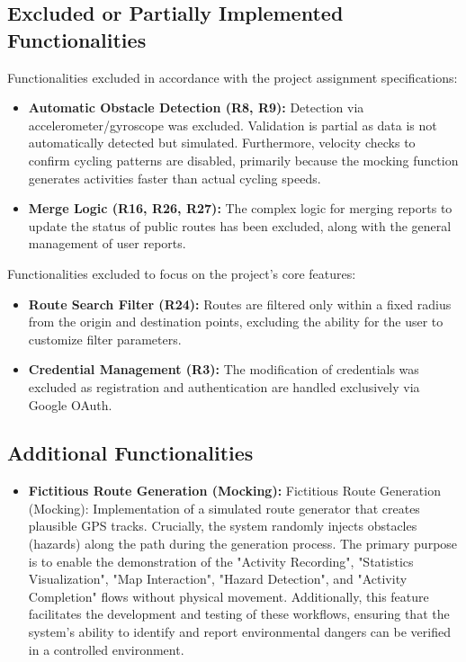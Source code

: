 \subsection{Excluded or Partially Implemented Functionalities}
Functionalities excluded in accordance with the project assignment specifications:
\begin{itemize}
    \item \textbf{Automatic Obstacle Detection (R8, R9):} Detection via accelerometer/gyroscope was excluded. Validation is partial as data is not automatically detected but simulated. Furthermore, velocity checks to confirm cycling patterns are disabled, primarily because the mocking function generates activities faster than actual cycling speeds.
    \item \textbf{Merge Logic (R16, R26, R27):} The complex logic for merging reports to update the status of public routes has been excluded, along with the general management of user reports.
\end{itemize}

Functionalities excluded to focus on the project's core features:
\begin{itemize}
    \item \textbf{Route Search Filter (R24):} Routes are filtered only within a fixed radius from the origin and destination points, excluding the ability for the user to customize filter parameters.
    \item \textbf{Credential Management (R3):} The modification of credentials was excluded as registration and authentication are handled exclusively via Google OAuth.
\end{itemize}

\subsection{Additional Functionalities}
\begin{itemize}
    \item \textbf{Fictitious Route Generation (Mocking):} Fictitious Route Generation (Mocking): Implementation of a simulated route generator that creates plausible GPS tracks. Crucially, the system randomly injects obstacles (hazards) along the path during the generation process. The primary purpose is to enable the demonstration of the "Activity Recording", "Statistics Visualization", "Map Interaction", "Hazard Detection", and "Activity Completion" flows without physical movement. Additionally, this feature facilitates the development and testing of these workflows, ensuring that the system's ability to identify and report environmental dangers can be verified in a controlled environment.
\end{itemize}